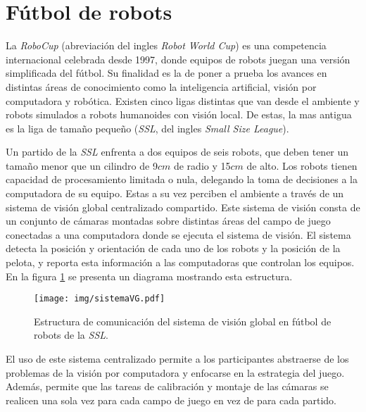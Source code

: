 
\section{Fútbol de robots}

La \emph{RoboCup} (abreviación del ingles \emph{Robot World Cup}) es una
competencia internacional celebrada desde 1997, donde equipos de robots juegan
una versión simplificada del fútbol. Su finalidad es la de poner a prueba los
avances en distintas áreas de conocimiento como la inteligencia artificial,
visión por computadora y robótica. Existen cinco ligas distintas que van desde
el ambiente y robots simulados a robots humanoides con visión local. De estas,
la mas antigua es la liga de tamaño pequeño (\emph{SSL}, del ingles \emph{Small
Size League}).

Un partido de la \emph{SSL} enfrenta a dos equipos de seis robots, que deben
tener un tamaño menor que un cilindro de 9$cm$ de radio y 15$cm$ de
alto\cite{sslrules2015}. Los robots tienen capacidad de procesamiento limitada o
nula, delegando la toma de decisiones a la computadora de su equipo. Estas a su
vez perciben el ambiente a través de un sistema de visión global centralizado
compartido. Este sistema de visión consta de un conjunto de cámaras montadas
sobre distintas áreas del campo de juego conectadas a una computadora donde se
ejecuta el sistema de visión. El sistema detecta la posición y orientación de
cada uno de los robots y la posición de la pelota, y reporta esta información a
las computadoras que controlan los equipos. En la figura \ref{sistemaVG} se
presenta un diagrama mostrando esta estructura.

\begin{figure}[!h]

	\texttt{[image: img/sistemaVG.pdf]}
	\caption{Estructura de comunicación del sistema de visión global en
	fútbol de robots de la \emph{SSL}.}
	\label{sistemaVG}

\end{figure}

El uso de este sistema centralizado permite a los participantes abstraerse de
los problemas de la visión por computadora y enfocarse en la estrategia del
juego. Además, permite que las tareas de calibración y montaje de las cámaras se
realicen una sola vez para cada campo de juego en vez de para cada partido.

